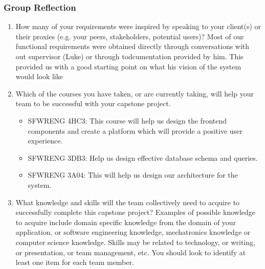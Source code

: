 \subsubsection*{Group Reflection}
\begin{enumerate}
  \item How many of your requirements were inspired by speaking to your client(s) or their proxies (e.g. your peers, stakeholders, potential users)?
  Most of our functional requirements were obtained directly through conversations with out supervisor (Luke) or through todcumentation provided by him. This provided us with a good starting point on what his vision of the system would look like 

  \item Which of the courses you have taken, or are currently taking, will help your team to be successful with your capstone project.
  \begin{itemize}
      \item SFWRENG 4HC3: This course will help us design the frontend components and create a platform which will provide a positive user experience.
      \item SFWRENG 3DB3: Help us design effective database schema and queries.
      \item SFWRENG 3A04: This will help us design our architecture for the system.
  \end{itemize}

  \item What knowledge and skills will the team collectively need to acquire to successfully complete this capstone project?  Examples of possible knowledge to acquire include domain specific knowledge from the domain of your application, or software engineering knowledge, mechatronics knowledge or computer science knowledge.  Skills may be related to technology, or writing, or presentation, or team management, etc. You should look to identify at
  least one item for each team member.
\end{enumerate}
